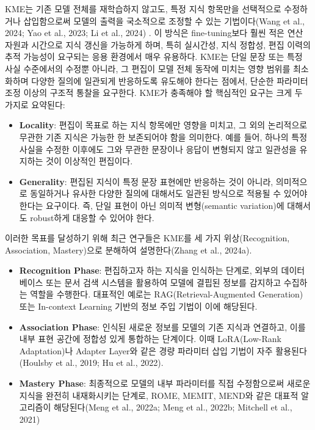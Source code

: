 \documentclass[a4paper,fleqn]{cas-sc}
\begin{document}
 KME는 기존 모델 전체를 재학습하지 않고도, 특정 지식 항목만을 선택적으로 수정하거나 삽입함으로써 모델의 출력을 국소적으로 조정할 수 있는 기법이다(Wang et al., 2024; Yao et al., 2023; Li et al., 2024) . 이 방식은 fine-tuning보다 훨씬 적은 연산 자원과 시간으로 지식 갱신을 가능하게 하며, 특히 실시간성, 지식 정합성, 편집 이력의 추적 가능성이 요구되는 응용 환경에서 매우 유용하다. KME는 단일 문장 또는 특정 사실 수준에서의 수정뿐 아니라, 그 편집이 모델 전체 동작에 미치는 영향 범위를 최소화하며 다양한 질의에 일관되게 반응하도록 유도해야 한다는 점에서, 단순한 파라미터 조정 이상의 구조적 통찰을 요구한다. KME가 충족해야 할 핵심적인 요구는 크게 두 가지로 요약된다:

 \begin{itemize}
    \item{\textbf{Locality}:
    편집이 목표로 하는 지식 항목에만 영향을 미치고, 그 외의 논리적으로 무관한 기존 지식은 가능한 한 보존되어야 함을 의미한다. 예를 들어, 하나의 특정 사실을 수정한 이후에도 그와 무관한 문장이나 응답이 변형되지 않고 일관성을 유지하는 것이 이상적인 편집이다.}

    \item{\textbf{Generality}:
    편집된 지식이 특정 문장 표현에만 반응하는 것이 아니라, 의미적으로 동일하거나 유사한 다양한 질의에 대해서도 일관된 방식으로 적용될 수 있어야 한다는 요구이다. 즉, 단일 표현이 아닌 의미적 변형(semantic variation)에 대해서도 robust하게 대응할 수 있어야 한다.}

\end{itemize}

이러한 목표를 달성하기 위해 최근 연구들은 KME를 세 가지 위상(Recognition, Association, Mastery)으로 분해하여 설명한다(Zhang et al., 2024a).

\begin{itemize}
    \item{\textbf{Recognition Phase}:
    편집하고자 하는 지식을 인식하는 단계로, 외부의 데이터베이스 또는 문서 검색 시스템을 활용하여 모델에 결핍된 정보를 감지하고 수집하는 역할을 수행한다. 대표적인 예로는 RAG(Retrieval-Augmented Generation) 또는 In-context Learning 기반의 정보 주입 기법이 이에 해당된다.}

    \item{\textbf{Association Phase}:
    인식된 새로운 정보를 모델의 기존 지식과 연결하고, 이를 내부 표현 공간에 정합성 있게 통합하는 단계이다. 이때 LoRA(Low-Rank Adaptation)나 Adapter Layer와 같은 경량 파라미터 삽입 기법이 자주 활용된다(Houlsby et al., 2019; Hu et al., 2022).}
    
    \item{\textbf{Mastery Phase}:
    최종적으로 모델의 내부 파라미터를 직접 수정함으로써 새로운 지식을 완전히 내재화시키는 단계로, ROME, MEMIT, MEND와 같은 대표적 알고리즘이 해당된다(Meng et al., 2022a; Meng et al., 2022b; Mitchell et al., 2021)}
\end{itemize}
\end{document}
